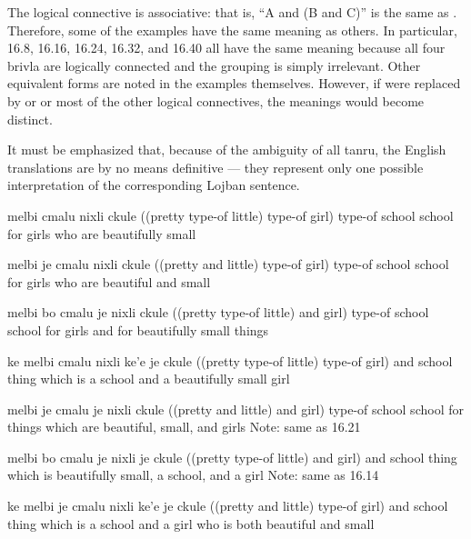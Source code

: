 The logical connective  is associative: that is, ``A
    and (B and C)'' is the same as . Therefore,
    some of the examples have the same meaning as others. In
    particular, 16.8, 16.16, 16.24, 16.32, and 16.40 all have the
    same meaning because all four brivla are logically connected
    and the grouping is simply irrelevant. Other equivalent forms
    are noted in the examples themselves. However, if  were
    replaced by  or  or most of the other logical
    connectives, the meanings would become distinct.

It must be emphasized that, because of the ambiguity of all
    tanru, the English translations are by no means definitive ---
    they represent only one possible interpretation of the
    corresponding Lojban sentence.
\begin{example}
melbi cmalu nixli ckule\n
((pretty type-of little) type-of girl) type-of school\n
school for girls who are beautifully small
\end{example}

\begin{example}
melbi je cmalu nixli ckule\n
((pretty and little) type-of girl) type-of school\n
school for girls who are beautiful and small
\end{example}

\begin{example}
melbi bo cmalu je nixli ckule\n
((pretty type-of little) and girl) type-of school\n
school for girls and for beautifully small things
\end{example}

\begin{example}
ke melbi cmalu nixli ke'e je ckule\n
((pretty type-of little) type-of girl) and school\n
thing which is a school and a beautifully small girl
\end{example}

\begin{example}
melbi je cmalu je nixli ckule\n
((pretty and little) and girl) type-of school\n
school for things which are beautiful, small, and girls\n
Note: same as 16.21
\end{example}

\begin{example}
melbi bo cmalu je nixli je ckule\n
((pretty type-of little) and girl) and school\n
thing which is beautifully small, a school, and a girl\n
Note: same as 16.14
\end{example}

\begin{example}
ke melbi je cmalu nixli ke'e je ckule\n
((pretty and little) type-of girl) and school\n
thing which is a school and a girl who is both\n
\T	beautiful and small
\end{example}

